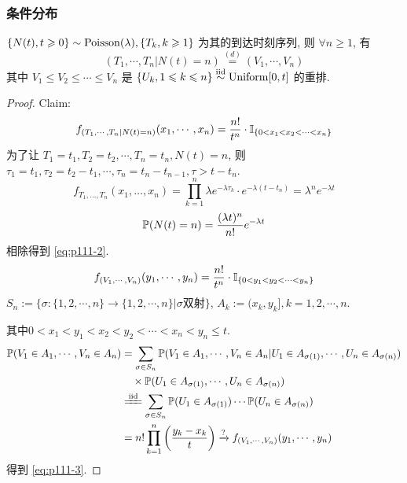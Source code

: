 \subsubsection{条件分布}

\begin{theorem}[到达时刻的条件分布]\label{thm:2.14}
    $\{N(t),t\geqslant 0\}\sim\operatorname{Poisson}(\lambda), \{T_k,k\geqslant 1\}$ 为其的到达时刻序列, 则 $\forall n\geq 1$, 有
    \begin{equation}
        (T_1,\cdots,T_n|N(t)=n)\overset{(d)}{=}(V_1,\cdots,V_n)
        \label{eq:p111-1}
    \end{equation}
    其中 $V_1\leq V_2\leq \cdots\leq V_n$ 是 $\{U_k,1\leqslant k\leqslant n\}\overset{\text{iid}}{\sim}\operatorname{Uniform}[0,t]$ 的重排.
\end{theorem}

\begin{proof}
    Claim: 
    \begin{equation}
        f_{(T_1,\cdots,T_n|N(t)=n)}(x_1,\cdots,x_n)=\frac{n!}{t^n}\cdot\mathbb I_{\{0<x_1<x_2<\cdots<x_n\}}
        \label{eq:p111-2}
    \end{equation}
    为了让 $T_1=t_1, T_2=t_2,\cdots,T_n=t_n,N(t)=n$, 则 $\tau_1=t_1,\tau_2=t_2-t_1,\cdots,\tau_n=t_n-t_{n-1},\tau>t-t_n$.
    \[
        f_{T_1,\dots,T_n}(x_1,\dots,x_n) = \prod_{k=1}^n\lambda e^{-\lambda \tau_k}\cdot e^{-\lambda(t-t_n)}= \lambda^n e^{-\lambda t}
    \]
    \[
        \mathbb{P}(N(t)=n) = \frac{(\lambda t)^n}{n!} e^{-\lambda t}
    \]
    相除得到 \eqref{eq:p111-2}.
    \begin{equation}
        f_{(V_1,\cdots,V_n)}(y_1,\cdots,y_n)=\frac{n!}{t^n}\cdot\mathbb I_{\{0<y_1<y_2<\cdots<y_n\}}
        \label{eq:p111-3}
    \end{equation}
    $S_n:=\{\sigma:\{1,2,\cdots,n\}\to\{1,2,\cdots,n\}|\sigma\text{双射}\}$, $A_k:=(x_k,y_k],k=1,2,\cdots,n$. 
    
    其中$0<x_1<y_1<x_2<y_2<\cdots<x_n<y_n\leq t$.
    \[
    \begin{aligned}
        \PP(V_1\in A_1,\cdots,V_n\in A_n) &=\sum_{\sigma\in S_n}\PP(V_1\in A_1,\cdots,V_n\in A_n|U_1\in A_{\sigma(1)},\cdots,U_n\in A_{\sigma(n)})\\
        &\quad \times \PP(U_1\in A_{\sigma(1)},\cdots,U_n\in A_{\sigma(n)})\\
        &\xlongequal{\text{iid}}\sum_{\sigma\in S_n}\PP(U_1\in A_{\sigma(1)})\cdots \PP(U_n\in A_{\sigma(n)})\\
        &=n!\prod_{k=1}^n \left(\frac{y_k-x_k}{t}\right)\xrightarrow{?}f_{(V_1,\cdots,V_n)}(y_1,\cdots,y_n)
    \end{aligned}
    \]
    得到 \eqref{eq:p111-3}.
\end{proof}

